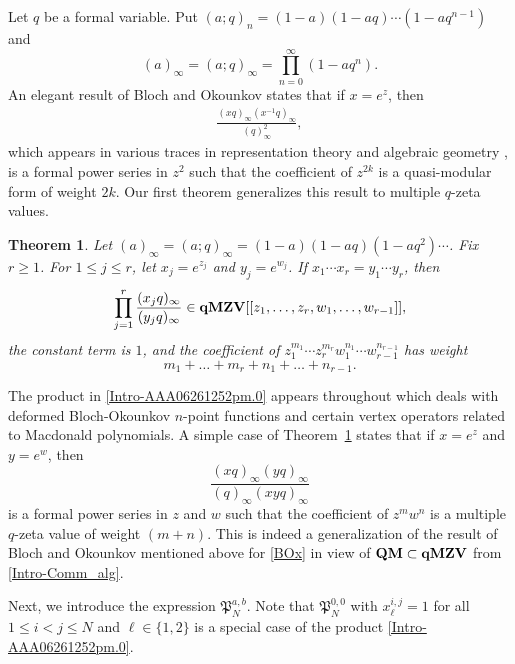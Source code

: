 \documentclass[12pt, reqno]{amsart}
\newtheorem{theorem}{Theorem}[section]
\theoremstyle{definition}
\theoremstyle{remark}
\numberwithin{equation}{section}
\newcommand{\qMZV}{ {\bf qMZV} }
\numberwithin{equation}{section}
\begin{document}
Let $q$ be a formal variable. 
Put $(a; q)_n = (1-a)(1-aq) \cdots (1-aq^{n-1})$ and
$$
(a)_\infty = (a; q)_\infty = \prod_{n=0}^\infty (1-aq^n).
$$
An elegant result of Bloch and Okounkov \cite{BO} states that 
if $x = e^z$, then 
\begin{eqnarray}    \label{BOx}
\frac{(xq)_\infty (x^{-1}q)_\infty}{(q)_\infty^2}, 
\end{eqnarray}
which appears in various traces in representation theory and 
algebraic geometry \cite{BO, Car1, Car2, LQW}, 
is a formal power series in $z^2$ such that 
the coefficient of $z^{2k}$ is a quasi-modular form of weight $2k$. 
Our first theorem generalizes this result to multiple $q$-zeta values. 

\begin{theorem}   \label{Intro-AAA06261252pm}
Let $(a)_\infty = (a; q)_\infty = (1-a)(1-aq)(1-aq^2) \cdots$.
Fix $r \ge 1$. For $1 \le j \le r$, let $x_j = e^{z_j}$ 
and $y_j = e^{w_j}$. If $x_1 \cdots x_r = y_1 \cdots y_r$, then 
\begin{eqnarray}    \label{Intro-AAA06261252pm.0}
\prod_{j = 1}^r \frac{(x_jq)_\infty}{(y_jq)_\infty} 
\in \qMZV[[z_1, \ldots, z_r, w_1, \ldots, w_{r-1}]],
\end{eqnarray}
the constant term is $1$, and the coefficient of 
$z_1^{m_1} \cdots z_r^{m_r} w_1^{n_1} \cdots w_{r-1}^{n_{r-1}}$ has weight
$$
m_1 + \ldots + m_r + n_1 + \ldots + n_{r-1}.
$$
\end{theorem}

The product in \eqref{Intro-AAA06261252pm.0} appears throughout \cite{CW} 
which deals with deformed Bloch-Okounkov $n$-point functions and 
certain vertex operators related to Macdonald polynomials. 
A simple case of Theorem~\ref{Intro-AAA06261252pm} states that 
if $x = e^z$ and $y = e^w$, then 
$$
\frac{(xq)_\infty (yq)_\infty}{(q)_\infty (xyq)_\infty}
$$
is a formal power series in $z$ and $w$ such that the coefficient of 
$z^mw^n$ is a multiple $q$-zeta value of weight $(m+n)$. 
This is indeed a generalization of the result of Bloch and Okounkov 
mentioned above for \eqref{BOx} in view of ${\bf QM} \subset \qMZV$ 
from \eqref{Intro-Comm_alg}.

Next, we introduce the expression $\mathfrak P_{N}^{a,b}$. 
Note that $\mathfrak P_{N}^{0,0}$ with 
$x_\ell^{i,j} = 1$ for all $1 \le i < j \le N$ and $\ell \in \{1, 2\}$ 
is a special case of the product \eqref{Intro-AAA06261252pm.0}.
\end{document}
